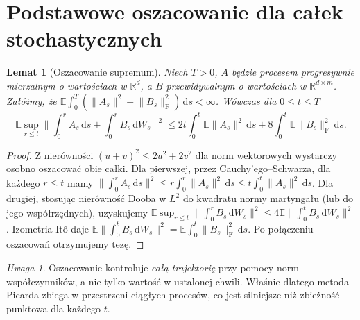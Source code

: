 \documentclass[11pt,a4paper,oneside]{report}
\numberwithin{equation}{chapter}
\theoremstyle{plain}
\newtheorem{lemat}[twierdzenie]{Lemat}
\theoremstyle{definition}
\theoremstyle{remark}
\newtheorem{uwaga}{Uwaga}[chapter]
\newcommand{\R}{\mathbb{R}}
\newcommand{\E}{\mathbb{E}}
\newcommand{\dd}{\mathrm{d}}
\newcommand{\norm}[1]{\lVert #1\rVert}
\begin{document}
\section{Podstawowe oszacowanie dla całek stochastycznych}\label{sec:volIII:05:03}
\begin{lemat}[Oszacowanie supremum]\label{lem:volIII:05:01}
\label{lem:sde-sup}
Niech $T>0$, $A$ będzie procesem progresywnie mierzalnym
o wartościach w $\R^d$, a $B$ przewidywalnym o wartościach
w $\R^{d\times m}$. Załóżmy, że
$\E\int_0^T(\norm{A_s}^2+\norm{B_s}_{\mathrm F}^2)\,\dd s<\infty$.
Wówczas dla $0\le t\le T$
\[
\E\sup_{r\le t}\norm{\int_0^r A_s\,\dd s+
\int_0^r B_s\,\dd W_s}^2
\le 2t\int_0^t\E\norm{A_s}^2\,\dd s
+8\int_0^t\E\norm{B_s}_{\mathrm F}^2\,\dd s.
\tag{5.2}\label{eq:sde-basic-est}
\]
\end{lemat}
\begin{proof}
Z nierówności $(u+v)^2\le2u^2+2v^2$ dla norm wektorowych
wystarczy osobno oszacować obie całki. Dla pierwszej,
przez Cauchy'ego--Schwarza, dla każdego $r\le t$ mamy
$\norm{\int_0^r A_s\,\dd s}^2
\le r\int_0^r\norm{A_s}^2\,\dd s
\le t\int_0^t\norm{A_s}^2\,\dd s$.
Dla drugiej, stosując nierówność Dooba w $L^2$
do kwadratu normy martyngału (lub do jego współrzędnych),
uzyskujemy
$\E\sup_{r\le t}\norm{\int_0^rB_s\,\dd W_s}^2
\le4\E\norm{\int_0^tB_s\,\dd W_s}^2$.
Izometria Itô daje $\E\norm{\int_0^tB_s\,\dd W_s}^2
=\E\int_0^t\norm{B_s}_{\mathrm F}^2\,\dd s$.
Po połączeniu oszacowań otrzymujemy tezę.
\end{proof}

\begin{uwaga}
Oszacowanie kontroluje \emph{całą trajektorię} przy pomocy
norm współczynników, a nie tylko wartość w ustalonej chwili.
Właśnie dlatego metoda Picarda zbiega w przestrzeni
ciągłych procesów, co jest silniejsze niż zbieżność
punktowa dla każdego $t$.
\end{uwaga}
\end{document}
